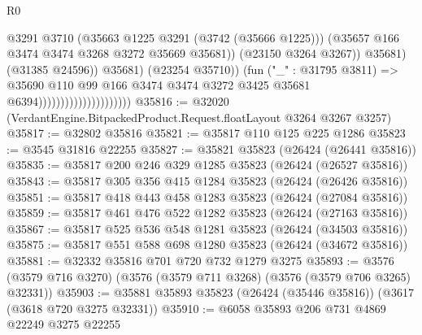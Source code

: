 \begin{lexlean}{R0}
\begin{coremodule}
                                                        @3291
                                                        @3710
                                                        (@35663 @1225 @3291 (@3742 (@35666 @1225)))
                                                        (@35657
                                                          @166
                                                          @3474
                                                          @3474
                                                          @3268
                                                          @3272
                                                          @35669
                                                          @35681))
                                                      (@23150 @3264 @3267))
                                                    @35681)
                                                  (@31385 @24596))
                                                @35681)
                                              (@23254 @35710))
                                            (fun ("_" : @31795 @3811) =>
                                            @35690
                                              @110
                                              @99
                                              @166
                                              @3474
                                              @3474
                                              @3272
                                              @3425
                                              @35681
                                              @6394)))))))))))))))))))))
@35816 := @32020 (VerdantEngine.BitpackedProduct.Request.floatLayout @3264 @3267 @3257)
@35817 := @32802 @35816
@35821 := @35817 @110 @125 @225 @1286
@35823 := @3545 @31816 @22255
@35827 := @35821 @35823 (@26424 (@26441 @35816))
@35835 := @35817 @200 @246 @329 @1285 @35823 (@26424 (@26527 @35816))
@35843 := @35817 @305 @356 @415 @1284 @35823 (@26424 (@26426 @35816))
@35851 := @35817 @418 @443 @458 @1283 @35823 (@26424 (@27084 @35816))
@35859 := @35817 @461 @476 @522 @1282 @35823 (@26424 (@27163 @35816))
@35867 := @35817 @525 @536 @548 @1281 @35823 (@26424 (@34503 @35816))
@35875 := @35817 @551 @588 @698 @1280 @35823 (@26424 (@34672 @35816))
@35881 := @32332 @35816 @701 @720 @732 @1279 @3275
@35893 := @3576 (@3579 @716 @3270) (@3576 (@3579 @711 @3268) (@3576 (@3579 @706 @3265) @32331))
@35903 := @35881 @35893 @35823 (@26424 (@35446 @35816)) (@3617 (@3618 @720 @3275 @32331))
@35910 := @6058 @35893 @206 @731 @4869 @22249 @3275 @22255

\end{coremodule}
\end{lexlean}
